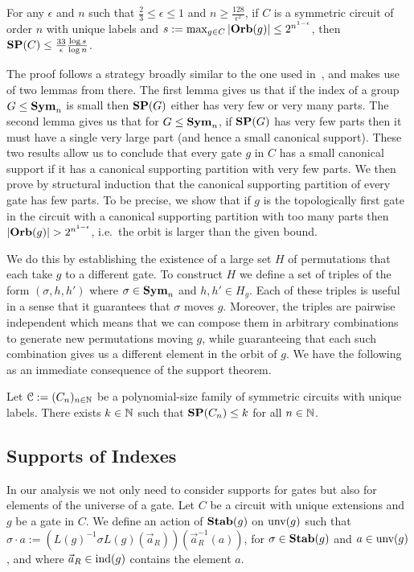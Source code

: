 \documentclass[a4paper,UKenglish]{lipics-v2018}
\begin{document}
\begin{theorem}
  \label{thm:support-thm}
  For any $\epsilon$ and $n$ such that $\frac{2}{3} \leq \epsilon \leq 1$ and $n
  \geq \frac{128}{\epsilon^2}$, if $C$ is a symmetric circuit of order $n$ with
  unique labels and $s := \max_{g \in C} \vert \text{\textbf{Orb}} (g)\vert \leq
  2^{n^{1-\epsilon}}$, then $\text{\textbf{SP}}(C) \leq \frac{33}{\epsilon}\frac{\log s}{\log
    n}$.
\end{theorem}

The proof follows a strategy broadly similar to the one used
in~\cite{AndersonD17}, and makes use of two lemmas from there. The first lemma
gives us that if the index of a group $G \leq \text{\textbf{Sym}}_n$ is small then $\text{\textbf{SP}}(G)$
either has very few or very many parts. The second lemma gives us that for $G
\leq \text{\textbf{Sym}}_n$, if $\text{\textbf{SP}}(G)$ has very few parts then it must have a single very
large part (and hence a small canonical support). These two results allow us to
conclude that every gate $g$ in $C$ has a small canonical support if it has a
canonical supporting partition with very few parts. We then prove by structural
induction that the canonical supporting partition of every gate has few parts.
To be precise, we show that if $g$ is the topologically first gate in the
circuit with a canonical supporting partition with too many parts then $\vert
\text{\textbf{Orb}}(g) \vert > 2^{n^{1 - \epsilon}}$, i.e.\ the orbit is larger than the given
bound.

We do this by establishing the existence of a large set $H$ of permutations that
each take $g$ to a different gate. To construct $H$ we define a set of triples
of the form $(\sigma, h, h')$ where $\sigma \in \text{\textbf{Sym}}_n$ and $h,h' \in H_g$. Each
of these triples is useful in a sense that it guarantees that $\sigma$ moves
$g$. Moreover, the triples are pairwise independent which means that we can
compose them in arbitrary combinations to generate new permutations moving $g$,
while guaranteeing that each such combination gives us a different element in
the orbit of $g$. We have the following as an immediate consequence of the
support theorem.

\begin{lemma}
  Let $\mathcal{C} := (C_n)_{n \in \mathbb{N}}$ be a polynomial-size family of
  symmetric circuits with unique labels. There exists $k \in \mathbb{N}$ such that
  $\text{\textbf{SP}}(C_n) \leq k$ for all $n \in \mathbb{N}$.
  \label{lem:constant-size-support}
\end{lemma}

\subsection*{Supports of Indexes}
In our analysis we not only need to consider supports for gates but also for
elements of the universe of a gate. Let $C$ be a circuit with unique extensions
and $g$ be a gate in $C$. We define an action of $\text{\textbf{Stab}}(g)$ on $\text{unv}(g)$
such that $\sigma \cdot a := (L(g)^{-1} \sigma L(g) (\vec{a}_R))
(\vec{a}^{-1}_R(a))$, for $\sigma \in \text{\textbf{Stab}}(g)$ and $a \in \text{unv}(g)$, and
where $\vec{a}_R \in \text{\upshape ind}(g)$ contains the element $a$.
\end{document}
